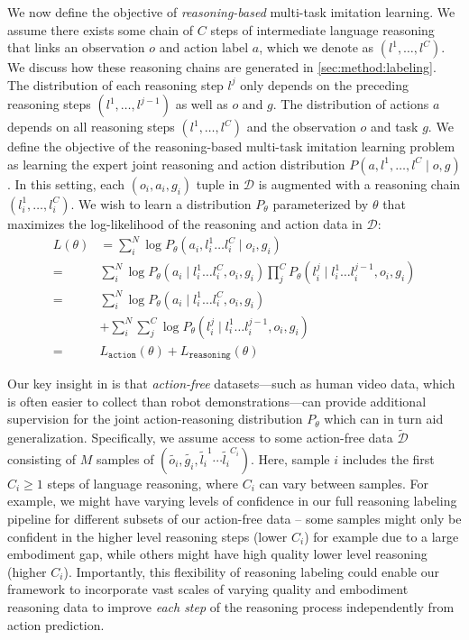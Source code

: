 We now define the objective of \textit{reasoning-based} multi-task imitation learning. We assume there exists some chain of $C$ steps of intermediate language reasoning that links an observation $o$ and action label $a$, which we denote as $(l^1, \ldots, l^C)$. We discuss how these reasoning chains are generated in \cref{sec:method:labeling}. The distribution of each reasoning step $l^j$ only depends on the preceding reasoning steps $(l^1, \dots, l^{j-1})$ as well as $o$ and $g$. The distribution of actions $a$ depends on all reasoning steps $(l^1, \ldots, l^C)$ and the observation $o$ and task $g$. We define the objective of the reasoning-based multi-task imitation learning problem as learning the expert joint reasoning and action distribution $P(a, l^1, \ldots, l^C \mid  o, g)$. In this setting, each $(o_i, a_i, g_i)$ tuple in $\mathcal{D}$ is augmented with a reasoning chain $(l_i^1, \ldots, l_i^C)$. We wish to learn a distribution $P_\theta$ parameterized by $\theta$ that  maximizes the log-likelihood of the reasoning and action data in $\mathcal{D}$:
\begin{align*}
    L(\theta)& = \sum_i^N \log P_\theta(a_i,l_i^1\dots l_i^C \mid o_i,g_i) \\
    =\ &\sum_i^N \log P_\theta(a_i \mid l_i^1\dots l_i^C,o_i,g_i) \prod_j^C P_\theta(l_i^j \mid l_i^1\dots l_i^{j-1},o_i,g_i)  \\
    =\ &\sum_i^N \log P_\theta(a_i \mid l_i^1\dots l_i^C,o_i,g_i) \\
    & + \sum_i^N \sum_j^C \log P_\theta(l_i^j \mid l_i^1\dots l_i^{j-1},o_i,g_i) \\
    =\  &L_{\texttt{action}}(\theta) + L_{\texttt{reasoning}}(\theta)
\end{align*}

Our key insight in \ACRO is that \textit{action-free} datasets---such as human video data, which is often easier to collect than robot demonstrations---can provide additional supervision for the joint action-reasoning distribution $P_\theta$ which can in turn aid generalization. Specifically, we assume access to some action-free data $\tilde{\mathcal{D}}$ consisting of $M$ samples of $(\tilde{o_i}, \tilde{g_i}, \tilde{l_i}^1 \cdots \tilde{l_i}^{C_i})$. Here, sample $i$ includes the first $C_i \geq 1$ steps of language reasoning, where $C_i$ can vary between samples. For example, we might have varying levels of confidence in our full reasoning labeling pipeline for different subsets of our action-free data -- some samples might only be confident in the higher level reasoning steps (lower $C_i$) for example due to a large embodiment gap, while others might have high quality lower level reasoning (higher $C_i$). Importantly, this flexibility of reasoning labeling could enable our framework to incorporate vast scales of varying quality and embodiment reasoning data to improve \emph{each step} of the reasoning process independently from action prediction.

